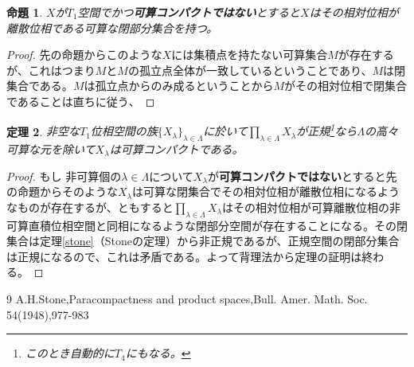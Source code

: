 \documentclass{jsarticle}
\newtheorem{theorem}{定理}
\newtheorem{proposition}[theorem]{命題}
\begin{document}
\begin{proposition}
$X$が$T_1$空間でかつ\textbf{可算コンパクトではない}とすると$X$はその相対位相が離散位相である可算な閉部分集合を持つ。
\end{proposition}
\begin{proof}
先の命題からこのような$X$には集積点を持たない可算集合$M$が存在するが、これはつまり$M$と$M$の孤立点全体が一致しているということであり、$M$は閉集合である。$M$は孤立点からのみ成るということから$M$がその相対位相で閉集合であることは直ちに従う、
\end{proof}
\begin{theorem}
非空な$T_1$位相空間の族$\{X_{\lambda}\}_{\lambda\in \Lambda}$に於いて$\displaystyle \prod_{\lambda\in \Lambda}X_{\lambda}$が正規\footnote{このとき自動的に$T_4$にもなる。}なら$\Lambda$の高々可算な元を除いて$X_{\lambda}$は可算コンパクトである。
\end{theorem}
\begin{proof}
もし	非可算個の$\lambda\in \Lambda$について$X_{\lambda}$が\textbf{可算コンパクトではない}とすると先の命題からそのような$X_{\lambda}$は可算な閉集合でその相対位相が離散位相になるようなものが存在するが、ともすると$\displaystyle \prod_{\lambda\in \Lambda}X_{\lambda}$はその相対位相が可算離散位相の非可算直積位相空間と同相になるような閉部分空間が存在することになる。その閉集合は定理\ref{stone}（Stoneの定理）から非正規であるが、正規空間の閉部分集合は正規になるので、これは矛盾である。よって背理法から定理の証明は終わる。
\end{proof}


\begin{thebibliography}{9}
A.H.Stone,Paracompactness and product spaces,Bull. Amer. Math. Soc. 54(1948),977-983
\end{thebibliography}
\end{document}
